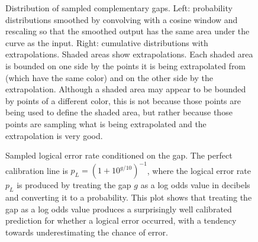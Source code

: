 \documentclass[onecolumn,unpublished,a4paper]{quantumarticle}
\theoremstyle{definition}
\theoremstyle{definition}
\theoremstyle{definition}
\begin{document}
\begin{figure}[h]
{    }
    \caption{
        Distribution of sampled complementary gaps.
        Left: probability distributions smoothed by convolving with a cosine window and rescaling so that the smoothed output has the same area under the curve as the input.
        Right: cumulative distributions with extrapolations.
        Shaded areas show extrapolations.
        Each shaded area is bounded on one side by the points it is being extrapolated from (which have the same color) and on the other side by the extrapolation.
        Although a shaded area may appear to be bounded by points of a different color, this is not because those points are being used to define the shaded area, but rather because those points are sampling what is being extrapolated and the extrapolation is very good.
    }
    \label{fig:gap}
\end{figure}

\begin{figure}[h]
    \centering
    \caption{
        Sampled logical error rate conditioned on the gap.
        The perfect calibration line is $p_L = (1 + 10^{g/10})^{-1}$, where the logical error rate $p_L$ is produced by treating the gap $g$ as a log odds value in decibels and converting it to a probability.
        This plot shows that treating the gap as a log odds value produces a surprisingly well calibrated prediction for whether a logical error occurred, with a tendency towards underestimating the chance of error.
    }
    \label{fig:gap_calibration}
\end{figure}
\end{document}
